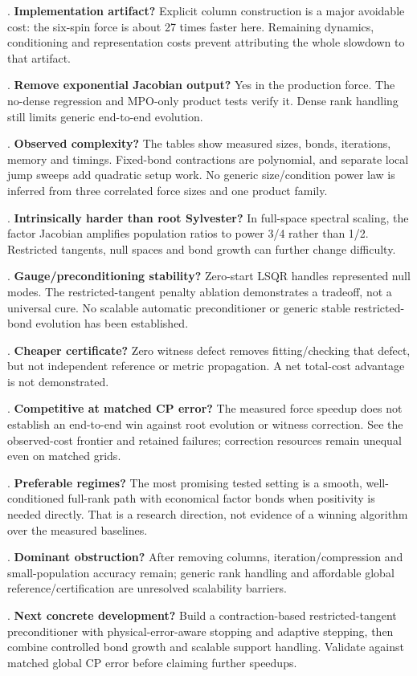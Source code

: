 \documentclass[10pt]{article}
\begin{document}
\par{}. \textbf{Implementation artifact?} Explicit column construction is a major avoidable
   cost: the six-spin force is about 27 times faster here. Remaining dynamics,
   conditioning and representation costs prevent attributing the whole slowdown
   to that artifact.
\par{}. \textbf{Remove exponential Jacobian output?} Yes in the production force. The
   no-dense regression and MPO-only product tests verify it. Dense rank handling
   still limits generic end-to-end evolution.
\par{}. \textbf{Observed complexity?} The tables show measured sizes, bonds, iterations,
   memory and timings. Fixed-bond contractions are polynomial, and separate local
   jump sweeps add quadratic setup work. No generic size/condition power law is
   inferred from three correlated force sizes and one product family.
\par{}. \textbf{Intrinsically harder than root Sylvester?} In full-space spectral scaling,
   the factor Jacobian amplifies population ratios to power 3/4 rather than 1/2.
   Restricted tangents, null spaces and bond growth can further change difficulty.
\par{}. \textbf{Gauge/preconditioning stability?} Zero-start LSQR handles represented null
   modes. The restricted-tangent penalty ablation demonstrates a tradeoff, not a
   universal cure. No scalable automatic preconditioner or generic stable
   restricted-bond evolution has been established.
\par{}. \textbf{Cheaper certificate?} Zero witness defect removes fitting/checking that
   defect, but not independent reference or metric propagation. A net total-cost
   advantage is not demonstrated.
\par{}. \textbf{Competitive at matched CP error?} The measured force speedup does not
   establish an end-to-end win against root evolution or witness correction.
   See the observed-cost frontier and retained failures; correction resources
   remain unequal even on matched grids.
\par{}. \textbf{Preferable regimes?} The most promising tested setting is a smooth,
   well-conditioned full-rank path with economical factor bonds when positivity
   is needed directly. That is a research direction, not evidence of a winning
   algorithm over the measured baselines.
\par{}. \textbf{Dominant obstruction?} After removing columns, iteration/compression and
   small-population accuracy remain; generic rank handling and affordable global
   reference/certification are unresolved scalability barriers.
\par{}. \textbf{Next concrete development?} Build a contraction-based restricted-tangent
    preconditioner with physical-error-aware stopping and adaptive stepping,
    then combine controlled bond growth and scalable support handling. Validate
    against matched global CP error before claiming further speedups.
\end{document}
